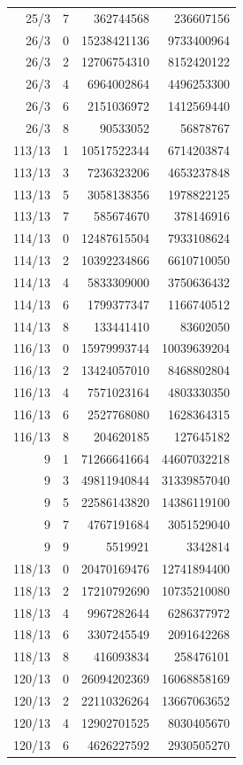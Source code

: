 \begin{longtable}{@{}rrrr@{}}
25/3 & 7 & 362744568 & 236607156\\
26/3 & 0 & 15238421136 & 9733400964\\
26/3 & 2 & 12706754310 & 8152420122\\
26/3 & 4 & 6964002864 & 4496253300\\
26/3 & 6 & 2151036972 & 1412569440\\
26/3 & 8 & 90533052 & 56878767\\
113/13 & 1 & 10517522344 & 6714203874\\
113/13 & 3 & 7236323206 & 4653237848\\
113/13 & 5 & 3058138356 & 1978822125\\
113/13 & 7 & 585674670 & 378146916\\
114/13 & 0 & 12487615504 & 7933108624\\
114/13 & 2 & 10392234866 & 6610710050\\
114/13 & 4 & 5833309000 & 3750636432\\
114/13 & 6 & 1799377347 & 1166740512\\
114/13 & 8 & 133441410 & 83602050\\
116/13 & 0 & 15979993744 & 10039639204\\
116/13 & 2 & 13424057010 & 8468802804\\
116/13 & 4 & 7571023164 & 4803330350\\
116/13 & 6 & 2527768080 & 1628364315\\
116/13 & 8 & 204620185 & 127645182\\
9 & 1 & 71266641664 & 44607032218\\
9 & 3 & 49811940844 & 31339857040\\
9 & 5 & 22586143820 & 14386119100\\
9 & 7 & 4767191684 & 3051529040\\
9 & 9 & 5519921 & 3342814\\
118/13 & 0 & 20470169476 & 12741894400\\
118/13 & 2 & 17210792690 & 10735210080\\
118/13 & 4 & 9967282644 & 6286377972\\
118/13 & 6 & 3307245549 & 2091642268\\
118/13 & 8 & 416093834 & 258476101\\
120/13 & 0 & 26094202369 & 16068858169\\
120/13 & 2 & 22110326264 & 13667063652\\
120/13 & 4 & 12902701525 & 8030405670\\
120/13 & 6 & 4626227592 & 2930505270\\

\end{longtable}
